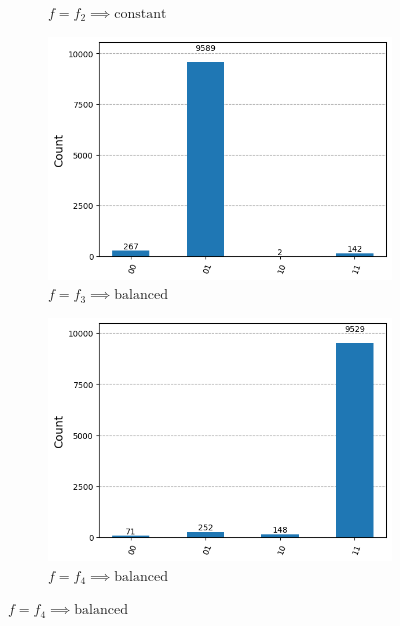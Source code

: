 \documentclass[12pt, oneside]{book}
\theoremstyle{definition}
\theoremstyle{definition}
\theoremstyle{remark}
\begin{document}
\begin{enumerate}
\begin{figure}[H]
\begin{subfigure}[b]{0.45\linewidth}
        \caption{$f=f_2\implies \text{constant}$}
        \label{fig:deutsch_jozsa_result_f2}
        \end{subfigure}
        \vspace{0.5 cm}
        \begin{subfigure}[b]{0.45\linewidth}
        \centering
        \includegraphics[width=1\linewidth]{../images/deutsch_jozsa_bal_0result.png}
        \caption{$f=f_3\implies \text{balanced}$}
        \label{fig:deutsch_jozsa_result_f3}
        \end{subfigure}
        \hfill
        \begin{subfigure}[b]{0.45\textwidth}
        \centering
        \includegraphics[width=1\linewidth]{../images/deutsch_jozsa_bal_1result.png}
        \caption{$f=f_4\implies \text{balanced}$}
        \label{fig:deutsch_jozsa_result_f4}

\end{subfigure}
\end{figure}
\end{enumerate}
\end{document}
